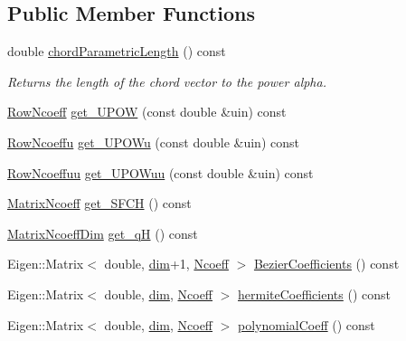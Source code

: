 \subsection*{Public Member Functions}
\begin{DoxyCompactItemize}
\item 
double \hyperlink{classmodel_1_1_spline_segment_base_3_01_derived_00_01dim_00_011_01_4_a910f1cf72a690d977f477f2d6f6bff11}{chord\+Parametric\+Length} () const 
\begin{DoxyCompactList}\small\item\em Returns the length of the chord vector to the power alpha. \end{DoxyCompactList}\item 
\hyperlink{_spline_enums_8h_a5a92526eb02d4d15fb803231f2cefe6d}{Row\+Ncoeff} \hyperlink{classmodel_1_1_spline_segment_base_3_01_derived_00_01dim_00_011_01_4_a893ac41d86387456afdeadf33a368934}{get\+\_\+\+U\+P\+O\+W} (const double \&uin) const 
\item 
\hyperlink{_spline_enums_8h_a1d55d9eae696394fe669c29c2b10b48d}{Row\+Ncoeffu} \hyperlink{classmodel_1_1_spline_segment_base_3_01_derived_00_01dim_00_011_01_4_a9214363557588a9b78e96482a8cbd94c}{get\+\_\+\+U\+P\+O\+Wu} (const double \&uin) const 
\item 
\hyperlink{_spline_enums_8h_a442d520d229fc9d7ccfcc1f21d289230}{Row\+Ncoeffuu} \hyperlink{classmodel_1_1_spline_segment_base_3_01_derived_00_01dim_00_011_01_4_aa72de1674bb469dbadf37c16b6882710}{get\+\_\+\+U\+P\+O\+Wuu} (const double \&uin) const 
\item 
\hyperlink{_spline_enums_8h_ab371c7f03c86d5953dc3b76e33bc4032}{Matrix\+Ncoeff} \hyperlink{classmodel_1_1_spline_segment_base_3_01_derived_00_01dim_00_011_01_4_a3b8fad14a48854344aab155620739179}{get\+\_\+\+S\+F\+C\+H} () const 
\item 
\hyperlink{_spline_enums_8h_afafac8412b0453751e060d8170f20bec}{Matrix\+Ncoeff\+Dim} \hyperlink{classmodel_1_1_spline_segment_base_3_01_derived_00_01dim_00_011_01_4_a9740a330a561a236247b8646d4fe2ac4}{get\+\_\+q\+H} () const 
\item 
Eigen\+::\+Matrix$<$ double, \hyperlink{plot_nd_a_8m_a382f3ca768b275b8d563604f7fc7df73}{dim}+1, \hyperlink{_spline_enums_8h_a7cc2e4244ca368f68e5746185eda6c4aa247e9ee4cf5980e4b82b85daddd8f437}{Ncoeff} $>$ \hyperlink{classmodel_1_1_spline_segment_base_3_01_derived_00_01dim_00_011_01_4_aee5604c3afb86b05de2f08d43cdccfa9}{Bezier\+Coefficients} () const 
\item 
Eigen\+::\+Matrix$<$ double, \hyperlink{plot_nd_a_8m_a382f3ca768b275b8d563604f7fc7df73}{dim}, \hyperlink{_spline_enums_8h_a7cc2e4244ca368f68e5746185eda6c4aa247e9ee4cf5980e4b82b85daddd8f437}{Ncoeff} $>$ \hyperlink{classmodel_1_1_spline_segment_base_3_01_derived_00_01dim_00_011_01_4_a54e33ad50c0fa0248eaab481d3e66e9c}{hermite\+Coefficients} () const 
\item 
Eigen\+::\+Matrix$<$ double, \hyperlink{plot_nd_a_8m_a382f3ca768b275b8d563604f7fc7df73}{dim}, \hyperlink{_spline_enums_8h_a7cc2e4244ca368f68e5746185eda6c4aa247e9ee4cf5980e4b82b85daddd8f437}{Ncoeff} $>$ \hyperlink{classmodel_1_1_spline_segment_base_3_01_derived_00_01dim_00_011_01_4_a3b40dee572785632e3b3c1ca7b64cc4d}{polynomial\+Coeff} () const 
\end{DoxyCompactItemize}
